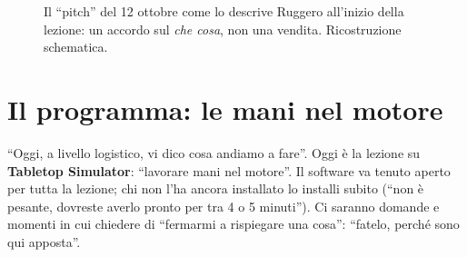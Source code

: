 \begin{figure}[htbp]
\centering
{}
\caption{Il ``pitch'' del 12 ottobre come lo descrive Ruggero all'inizio della
lezione: un accordo sul \emph{che cosa}, non una vendita. Ricostruzione schematica.}
\label{a8:fig:pitch}
\end{figure}

\section{Il programma: le mani nel motore}
\label{a8:sec:programma}

``Oggi, a livello logistico, vi dico cosa andiamo a fare''. Oggi è la lezione su
\textbf{Tabletop Simulator}: ``lavorare mani nel motore''. Il software va tenuto
aperto per tutta la lezione; chi non l'ha ancora installato lo installi subito (``non
è pesante, dovreste averlo pronto per tra 4 o 5 minuti''). Ci saranno domande e
momenti in cui chiedere di ``fermarmi a rispiegare una cosa'': ``fatelo, perché sono
qui apposta''.

